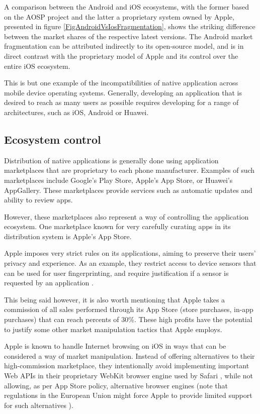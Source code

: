 A comparison between the Android and iOS ecosystems, with the former based on the AOSP project and the latter a proprietary system owned by Apple, presented in figure \ref{FigAndroidVsIosFragmentation}, shows the striking difference between the market shares of the respective latest versions. The Android market fragmentation can be attributed indirectly to its open-source model, and is in direct contrast with the proprietary model of Apple and its control over the entire iOS ecosystem.

This is but one example of the incompatibilities of native application across mobile device operating systems. Generally, developing an application that is desired to reach as many users as possible requires developing for a range of architectures, such as iOS, Android or Huawei.

\subsection{Ecosystem control}
Distribution of native applications is generally done using application marketplaces that are proprietary to each phone manufacturer. Examples of such marketplaces include Google's Play Store, Apple's App Store, or Huawei's AppGallery. These marketplaces provide services such as automatic updates and ability to review apps.

However, these marketplaces also represent a way of controlling the application ecosystem. One marketplace known for very carefully curating apps in its distribution system is Apple's App Store.

Apple imposes very strict rules on its applications, aiming to preserve their users' privacy and experience. As an example, they restrict access to device sensors that can be used for user fingerprinting, and require justification if a sensor is requested by an application \cite{ZdnetNewAppleStoreRules}.

This being said however, it is also worth mentioning that Apple takes a commission of all sales performed through its App Store (store purchases, in-app purchases) that can reach percents of 30\%. These high profits have the potential to justify some other market manipulation tactics that Apple employs.

Apple is known to handle Internet browsing on iOS in ways that can be considered a way of market manipulation. Instead of offering alternatives to their high-commission marketplace, they intentionally avoid implementing important Web APIs in their proprietary WebKit browser engine used by Safari \cite{ZdnetAppleDeclinedWebApis}, while not allowing, as per App Store policy, alternative browser engines \cite{AppleGuidelinesWebkit} (note that regulations in the European Union might force Apple to provide limited support for such alternatives \cite{AppleAlternativeBrowsersEU}).

